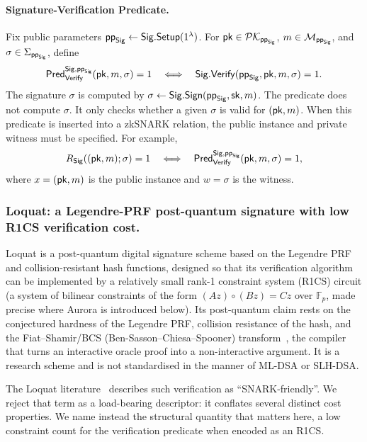 \paragraph{Signature-Verification Predicate.}
Fix public parameters $\mathsf{pp}_{\mathsf{Sig}}\leftarrow\mathsf{Sig}.\mathsf{Setup}(1^\lambda)$. For $\mathsf{pk}\in\mathcal{PK}_{\mathsf{pp}_{\mathsf{Sig}}}$, $m\in\mathcal{M}_{\mathsf{pp}_{\mathsf{Sig}}}$, and $\sigma\in\Sigma_{\mathsf{pp}_{\mathsf{Sig}}}$, define
\begin{equation*}
  \mathsf{Pred}_{\mathsf{Verify}}^{\mathsf{Sig},\mathsf{pp}_{\mathsf{Sig}}}(\mathsf{pk},m,\sigma)=1
  \quad\Longleftrightarrow\quad
  \mathsf{Sig}.\mathsf{Verify}(\mathsf{pp}_{\mathsf{Sig}},\mathsf{pk},m,\sigma)=1.
\end{equation*}
The signature $\sigma$ is computed by $\sigma\leftarrow\mathsf{Sig}.\mathsf{Sign}(\mathsf{pp}_{\mathsf{Sig}},\mathsf{sk},m)$. The predicate does not compute $\sigma$. It only checks whether a given $\sigma$ is valid for $(\mathsf{pk},m)$. When this predicate is inserted into a zkSNARK relation, the public instance and private witness must be specified. For example,
\begin{equation*}
  R_{\mathsf{Sig}}((\mathsf{pk},m);\sigma)=1
  \quad\Longleftrightarrow\quad
  \mathsf{Pred}_{\mathsf{Verify}}^{\mathsf{Sig},\mathsf{pp}_{\mathsf{Sig}}}(\mathsf{pk},m,\sigma)=1,
\end{equation*}
where $x=(\mathsf{pk},m)$ is the public instance and $w=\sigma$ is the witness.

\subsubsection{Loquat: a Legendre-PRF post-quantum signature with low R1CS verification cost.}
Loquat is a post-quantum digital signature scheme based on the Legendre PRF and collision-resistant hash functions, designed so that its verification algorithm can be implemented by a relatively small rank-1 constraint system (R1CS) circuit (a system of bilinear constraints of the form $(Az)\circ(Bz)=Cz$ over $\mathbb{F}_p$, made precise where Aurora is introduced below). Its post-quantum claim rests on the conjectured hardness of the Legendre PRF, collision resistance of the hash, and the Fiat--Shamir/BCS (Ben-Sasson--Chiesa--Spooner) transform~\cite{bensasson2016iop}, the compiler that turns an interactive oracle proof into a non-interactive argument. It is a research scheme and is not standardised in the manner of ML-DSA or SLH-DSA.

The Loquat literature~\cite{cryptoeprint:2024/868} describes such verification as ``SNARK-friendly''. We reject that term as a load-bearing descriptor: it conflates several distinct cost properties. We name instead the structural quantity that matters here, a low constraint count for the verification predicate when encoded as an R1CS.

